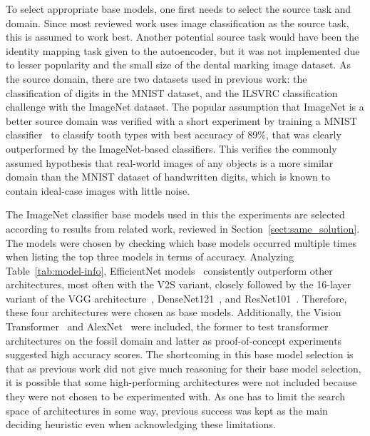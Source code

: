 \documentclass[english,twoside,openright]{UH_DS_MSc}
\begin{document}


To select appropriate base models, one first needs to select the source task and domain. Since most reviewed work uses image classification as the source task, this is assumed to work best.
Another potential source task would have been the identity mapping task given to the autoencoder,
but it was not implemented due to lesser popularity and the small size of the dental marking image dataset.
As the source domain, there are two datasets used in previous work: the classification of digits in the MNIST dataset, 
and the ILSVRC classification challenge with the ImageNet dataset. The popular 
assumption that ImageNet is a better source domain was verified with a short experiment by training a MNIST classifier~\cite{jamilemnist}
to classify tooth types with best accuracy of 89\%, that was clearly outperformed by the ImageNet-based classifiers. This verifies the commonly assumed hypothesis that real-world images of any objects is a more 
similar domain than the MNIST dataset of handwritten digits, which is known to contain ideal-case images with little noise.

The ImageNet classifier base models used in this the experiments are selected 
according to results from related work, reviewed in Section~\ref{sect:same_solution}.
The models were chosen by checking which base models 
occurred multiple times when listing the top three models in terms of accuracy. 
Analyzing Table~\ref{tab:model-info}, EfficientNet models~\cite{efficientnetv2} consistently outperform 
other architectures, most often with the V2S variant, closely followed by the 16-layer variant of the VGG architecture~\cite{vgg},
DenseNet121~\cite{densenet}, and ResNet101~\cite{resnet}.
Therefore, these four architectures were chosen as base models.
Additionally, the Vision Transformer~\cite{vit} and AlexNet~\cite{alexnet} were included, the former to test 
transformer architectures on the fossil domain and latter
as proof-of-concept experiments suggested high accuracy scores.
The shortcoming in this base model selection is that as previous work did not give much
 reasoning for their base model selection, it is possible that some high-performing architectures were not included 
because  they were not chosen to be experimented with. As one has to limit the 
search space of architectures in some way, previous success was kept as the main deciding heuristic 
even when acknowledging these limitations.
\end{document}
